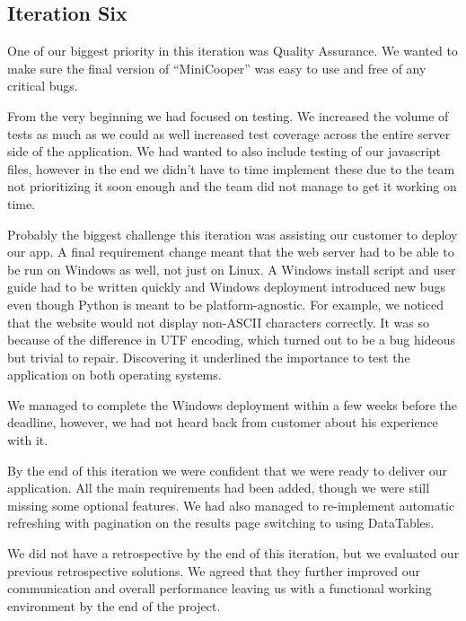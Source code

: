 \documentclass{l3proj}
\begin{document}
\subsection{Iteration Six}

One of our biggest priority in this iteration was Quality Assurance. We wanted to make sure the final version of ``MiniCooper'' was easy to use and free of any critical bugs.

From the very beginning we had focused on testing.  We increased the volume of tests as much as we could as well increased test coverage across the entire server side of the application. We had wanted to also include testing of our javascript files, however in the end we didn’t have to time implement these due to the team not prioritizing it soon enough and the team did not manage to get it working on time.


Probably the biggest challenge this iteration was assisting our customer to deploy our app. A final requirement change meant that the web server had to be able to be run on Windows as well, not just on Linux. A Windows install script and user guide had to be written quickly and Windows deployment introduced new bugs even though Python is meant to be platform-agnostic. For example, we noticed that the website would not display non-ASCII characters correctly. It was so because of the difference in UTF encoding, which turned out to be a bug hideous but trivial to repair. Discovering it underlined the importance to test the application on both operating systems.

We managed to complete the Windows deployment within a few weeks before the deadline, however, we had not heard back from customer about his experience with it. 

By the end of this iteration we were confident that we were ready to deliver our application. All the main requirements had been added, though we were still missing some optional features. We had also managed to re-implement automatic refreshing with pagination on the results page switching to using DataTables.

We did not have a retrospective by the end of this iteration, but we evaluated our previous retrospective solutions. We agreed that they further improved our communication and overall performance leaving us with a functional working environment by the end of the project.

\end{document}
